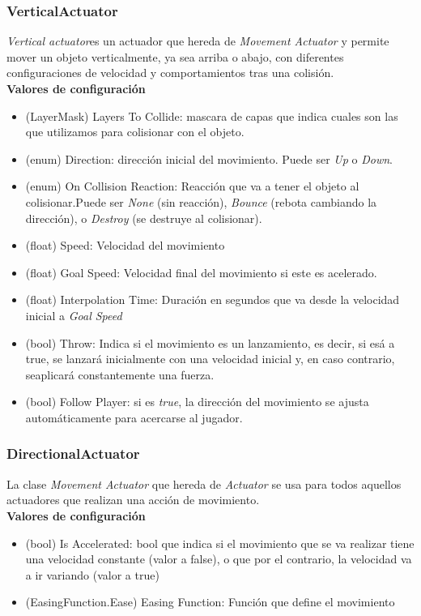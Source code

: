 \subsubsection{VerticalActuator}
\textit{Vertical actuator}es un actuador que hereda de \textit{Movement Actuator} y permite mover un objeto verticalmente, ya sea arriba o abajo, con diferentes configuraciones de velocidad y comportamientos tras una colisión.\\
\textbf{Valores de configuración}
\begin{itemize}
	\item (LayerMask) Layers To Collide: mascara de capas que indica cuales son las que utilizamos para colisionar con el objeto.
	\item (enum) Direction: dirección inicial del movimiento. Puede ser \textit{Up} o \textit{Down}.
	\item (enum) On Collision Reaction: Reacción que va a tener el objeto al colisionar.Puede ser \textit{None} (sin reacción), \textit{Bounce} (rebota cambiando la dirección), o \textit{Destroy} (se destruye al colisionar).
	\item (float) Speed: Velocidad del movimiento
	\item (float) Goal Speed: Velocidad final del movimiento si este es acelerado.
	\item (float) Interpolation Time: Duración en segundos que va desde la velocidad inicial a \textit{Goal Speed}
	\item (bool) Throw: Indica si el movimiento es un lanzamiento, es decir, si esá a true, se lanzará inicialmente con una velocidad inicial y, en caso contrario, seaplicará constantemente una fuerza.
	\item (bool) Follow Player: si es \textit{true}, la dirección del movimiento se ajusta automáticamente para acercarse al jugador.
\end{itemize}

\subsubsection{DirectionalActuator}
La clase \textit{Movement Actuator} que hereda de \textit{Actuator} se usa para todos aquellos actuadores que realizan una acción de movimiento.\\
\textbf{Valores de configuración}
\begin{itemize}
	\item (bool) Is Accelerated: bool que indica si el movimiento que se va realizar tiene una velocidad constante (valor a false), o que por el contrario, la velocidad va a ir variando (valor a true)
	\item (EasingFunction.Ease) Easing Function: Función que define el movimiento 
\end{itemize}


